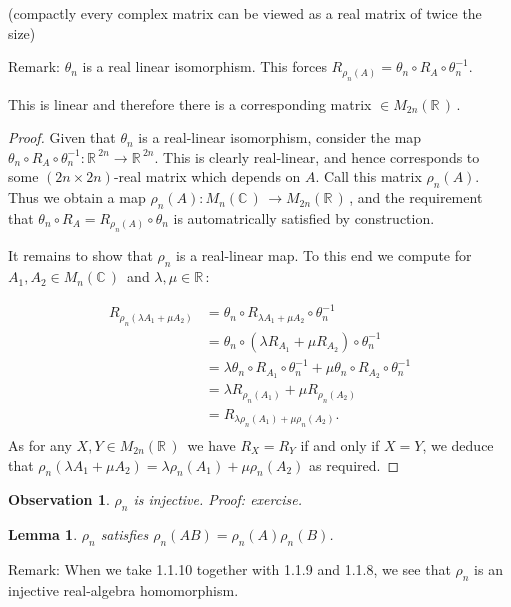 \documentclass[12pt,a4paper]{article}
\newcommand{\rR}{\ensuremath{\mathbb{R}\,}}
\newcommand{\cC}{\ensuremath{\mathbb{C}\,}}
\newcommand{\mnc}{\ensuremath{M_n(\cC)\,}}
\newcommand{\mr}[1]{\ensuremath{M_{#1}(\rR)\,}}
\newtheorem{lemma}[thm]{Lemma}
\newtheorem{obs}[thm]{Observation}
\begin{document}
(compactly every complex matrix can be viewed as a real matrix of twice the size)

Remark: $\theta _n $ is  a real linear isomorphism. This forces $R_{\rho _n (A)}=\theta _n \circ R_A \circ \theta _n^{-1}$.

This is linear and therefore there is a corresponding matrix $\in \mr{2n}$.

\begin{proof}
Given that $\theta _n$ is a real-linear isomorphism, consider the map $\theta_n \circ R_A \circ \theta_n^{-1} : \rR^{2n} \to \rR^{2n}$. This is clearly real-linear, and hence corresponds to some $(2n\times 2n)$-real matrix which depends on $A$. Call this matrix $\rho_n(A)$. Thus we obtain a map $\rho_n (A) : \mnc \to \mr{2n}$, and the requirement that $\theta_n \circ R_A = R_{\rho_n (A)} \circ \theta_n$ is automatrically satisfied by construction. 

It remains to show that $\rho_n$ is a real-linear map. To this end we compute for $A_1, A_2 \in \mnc$ and $\lambda, \mu \in \rR$:

\begin{align*}
R_{\rho_n (\lambda A_1 + \mu A_2)} 
&= \theta_n \circ R_{\lambda A_1 + \mu A_2} \circ \theta_n^{-1} \\
&= \theta_n \circ (\lambda R_{A_1} + \mu R_{A_2}) \circ \theta_n^{-1} \\
&= \lambda \theta_n \circ R_{A_1} \circ \theta_n^{-1} + 
   \mu     \theta_n \circ R_{A_2} \circ \theta_n^{-1} \\
&= \lambda R_{\rho_n(A_1)} + \mu R_{\rho_n(A_2)} \\
&= R_{\lambda \rho_n(A_1) + \mu \rho_n(A_2)}.\\
\end{align*}
As for any $X, Y \in \mr{2n}$ we have $R_X = R_Y$ if and only if $X = Y$, we deduce that $\rho_n (\lambda A_1 + \mu A_2) = \lambda \rho_n(A_1) + \mu \rho_n(A_2)$ as required.
\end{proof}

\begin{obs}
$\rho_n$ is injective. Proof: exercise.
\end{obs}

\begin{lemma}
$\rho _n$ satisfies $\rho_n(AB)= \rho_n(A)\rho_n(B)$.
\end{lemma}

Remark: When we take 1.1.10 together with 1.1.9 and 1.1.8, we see that $\rho_n$ is an injective real-algebra homomorphism.
\end{document}
